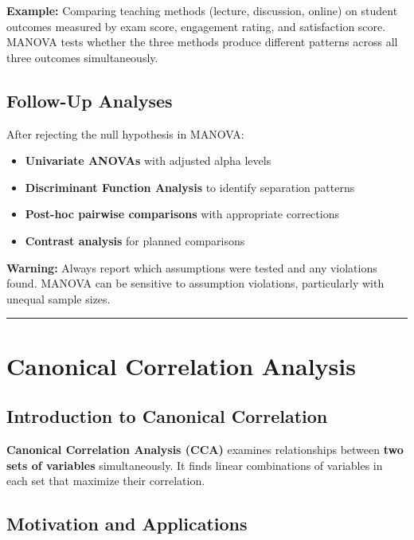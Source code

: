 \documentclass[
]{article}
\begin{document}
\textbf{Example: } Comparing teaching methods (lecture, discussion,
online) on student outcomes measured by exam score, engagement rating,
and satisfaction score. MANOVA tests whether the three methods produce
different patterns across all three outcomes simultaneously.

\textbf{ }

\subsection{Follow-Up Analyses}

After rejecting the null hypothesis in MANOVA:

\begin{itemize}
\item
  \textbf{Univariate ANOVAs} with adjusted alpha levels
\item
  \textbf{Discriminant Function Analysis} to identify separation
  patterns
\item
  \textbf{Post-hoc pairwise comparisons} with appropriate corrections
\item
  \textbf{Contrast analysis} for planned comparisons
\end{itemize}

\textbf{Warning: } Always report which assumptions were tested and any
violations found. MANOVA can be sensitive to assumption violations,
particularly with unequal sample sizes.

\begin{center}\rule{0.5\linewidth}{0.5pt}\end{center}

\textbf{ }

\section{Canonical Correlation Analysis}

\textbf{ }

\subsection{Introduction to Canonical Correlation}

\textbf{Canonical Correlation Analysis (CCA)} examines relationships
between \textbf{two sets of variables} simultaneously. It finds linear
combinations of variables in each set that maximize their correlation.

\textbf{ }

\subsection{Motivation and Applications}
\end{document}
